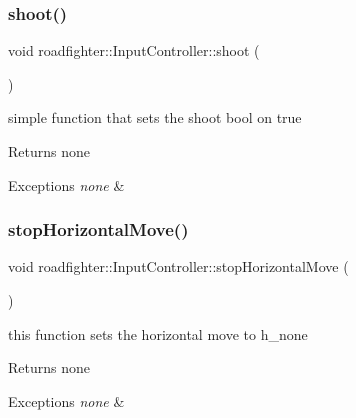 \subsubsection{\texorpdfstring{shoot()}{shoot()}}
{\footnotesize\ttfamily void roadfighter\+::\+Input\+Controller\+::shoot (\begin{DoxyParamCaption}{ }\end{DoxyParamCaption})}

simple function that sets the shoot bool on true \begin{DoxyReturn}{Returns}
none 
\end{DoxyReturn}

\begin{DoxyExceptions}{Exceptions}
{\em none} & \\
\hline
\end{DoxyExceptions}
\mbox{\label{classroadfighter_1_1InputController_aa5d545e2810c9b9b46b219d9baa1e32e}} 
\subsubsection{\texorpdfstring{stop\+Horizontal\+Move()}{stopHorizontalMove()}}
{\footnotesize\ttfamily void roadfighter\+::\+Input\+Controller\+::stop\+Horizontal\+Move (\begin{DoxyParamCaption}{ }\end{DoxyParamCaption})}

this function sets the horizontal move to h\+\_\+none \begin{DoxyReturn}{Returns}
none 
\end{DoxyReturn}

\begin{DoxyExceptions}{Exceptions}
{\em none} & \\
\hline
\end{DoxyExceptions}
\mbox{\label{classroadfighter_1_1InputController_a9a3281103fedbc1e86dd936731209ee9}} 
